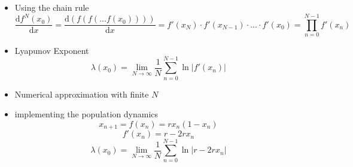 \documentclass[ignorenonframetext]{beamer}
\newcommand{\dif}{\mathrm{d}}
\begin{document}
\begin{frame}
\begin{itemize}
\item Using the chain rule
\begin{equation}
\frac{\dif f^N(x_0)}{\dif x}=\frac{\dif (f(f(...f(x_0))))}{\dif x}=
f'(x_N)\cdot f'(x_{N-1})\cdot ...\cdot f'(x_0)=\prod\limits_{n=0}^{N-1} f'(x_n)
\end{equation}
\item Lyapunov Exponent
\begin{equation}
\lambda(x_0)=\lim \limits_{N\rightarrow\infty}\frac{1}{N}\sum\limits_{n=0}^{N-1}\ln|f'(x_n)|
\end{equation}
\item Numerical approximation with finite $N$ 
\end{itemize}
\end{frame}

\begin{frame}
\begin{itemize}
\item implementing the population dynamics
\begin{equation}
x_{n+1} = f(x_n)=rx_n(1-x_n)
\end{equation}
\begin{equation}
f'(x_n) = r-2rx_n
\end{equation}
\begin{equation}
\lambda(x_0)= \lim \limits_{N\rightarrow\infty}\frac{1}{N}\sum\limits_{n=0}^{N-1}\ln|r-2rx_n|
\end{equation}
\end{itemize}
\end{frame}
\end{document}
